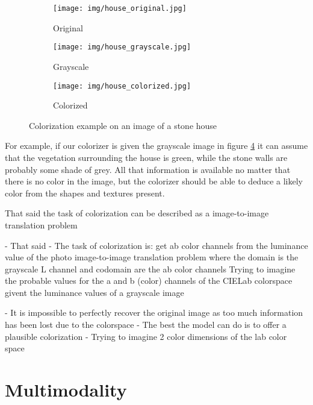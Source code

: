 \begin{figure}[h!]
	\centering
	\begin{subfigure}{.32\textwidth}
		\centering
		\texttt{[image: img/house\_original.jpg]}
        \caption{Original}
		\label{fig:stone_house:original}
	\end{subfigure}
    \begin{subfigure}{.32\textwidth}
		\centering
		\texttt{[image: img/house\_grayscale.jpg]}
        \caption{Grayscale}
        \label{fig:stone_house:grayscale}
    \end{subfigure}
	\begin{subfigure}{.32\textwidth}
		\centering
		\texttt{[image: img/house\_colorized.jpg]}
        \caption{Colorized}
        \label{fig:stone_house:colorized}
    \end{subfigure}
    \caption{Colorization example on an image of a stone house}
	\label{fig:stone_house}
\end{figure}

For example, if our colorizer is given the grayscale image in figure 
\ref{fig:stone_house} it can assume that the vegetation surrounding the 
house is green, while the stone walls are probably some shade of grey. 
All that information is available no matter that there is no color 
in the image, but the colorizer should be able to deduce a likely color from the 
shapes and textures present. 

That said the task of colorization can be described as a image-to-image translation problem

- That said
- The task of colorization is:
    get ab color channels from the luminance value of the photo
    image-to-image translation problem where the domain is the grayscale L channel and codomain are the ab color channels 
    Trying to imagine the probable values for the a and b (color) channels
    of the CIELab colorspace givent the luminance values of a grayscale image



- It is impossible to perfectly recover the original image as too much information has been lost due to the colorspace
- The best the model can do is to offer a plausible colorization
- Trying to imagine 2 color dimensions of the lab color space


\section{Multimodality}
\label{sec:multimodality}

